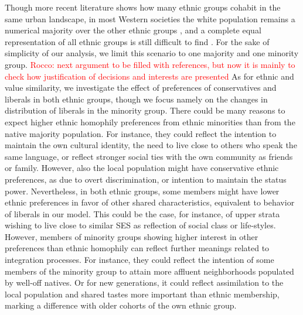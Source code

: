 \documentclass{article}
\newcommand{\rocco}[1]{{\textcolor{red}{Rocco: #1}}} %
\begin{document}
Though more recent literature shows how many ethnic groups cohabit in the same urban landscape, in most Western societies the white population remains a numerical majority over the other ethnic groups \autocite{vertovec2007super}, and a complete equal representation of all ethnic groups is still difficult to find \autocite{lee2012racial}. For the sake of simplicity of our analysis, we limit this scenario to one majority and one minority group. \rocco{next argument to be filled with references, but now it is mainly to check how justification of decisions and interests are presented} As for ethnic and value similarity, we investigate the effect of preferences of conservatives and liberals in both ethnic groups, though we focus namely on the changes in distribution of liberals in the minority group. There could be many reasons to expect higher ethnic homophily preferences from ethnic minorities than from the native majority population. For instance, they could reflect the intention to maintain the own cultural identity, the need to live close to others who speak the same language, or reflect stronger social ties with the own community as friends or family. However, also the local population might have conservative ethnic preferences, as due to overt discrimination, or intention to maintain the status power. Nevertheless, in both ethnic groups, some members might have lower ethnic preferences in favor of other shared characteristics, equivalent to behavior of liberals in our model. This could be the case, for instance, of upper strata wishing to live close to similar SES as reflection of social class or life-styles. However, members of minority groups showing higher interest in other preferences than ethnic homophily can reflect further meanings related to integration processes. For instance, they could reflect the intention of some members of the minority group to attain more affluent neighborhoods populated by well-off natives. Or for new generations, it could reflect assimilation to the local population and shared tastes more important than ethnic membership, marking a difference with older cohorts of the own ethnic group. %
\end{document}
